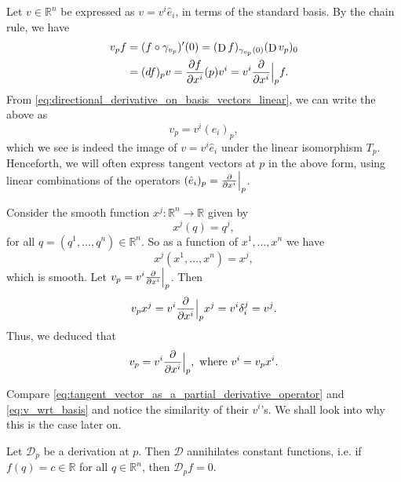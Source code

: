 \documentclass[notoc,notitlepage]{tufte-book}
\DeclareMathOperator{\D}{D}
\begin{document}
Let $v \in \mathbb{R}^n$ be expressed as $v = v^i \hat{e}_i$, in terms of the
standard basis. By the chain rule, we have
\begin{align*}
  v_p f &= (f \circ \gamma_{v_p})'(0) = (\D f)_{\gamma_{v_p}(0)} (\D v_p)_0 \\
    &= (\dif{f})_p v = \frac{\partial f}{\partial x^i}(p) v^i
    = v^i \frac{\partial}{\partial x^i}\at{p}{} f.
\end{align*}
From \cref{eq:directional_derivative_on_basis_vectors_linear}, we can write the
above as
\begin{equation*}
  v_p = v^i (\hat{e}_i)_p,
\end{equation*}
which we see is indeed the image of $v = v^i \hat{e}_i$ under the linear isomorphism
$T_p$.
Henceforth, we will often express tangent vectors at $p$ in the above form, using
linear combinations of the operators $(\hat{e}_i)_p = \frac{\partial}{\partial x^i} \Big|_{p}^{}$.

 Consider the smooth function $x^j : \mathbb{R}^n \to \mathbb{R}$
given by
\begin{equation*}
  x^j(q) = q^j,
\end{equation*}
for all $q = (q^1, \ldots, q^n) \in \mathbb{R}^n$. So as a function of $x^1, \ldots, x^n$ we have
\begin{equation}\label{eq:coefficients_as_smooth_functions}
  x^j(x^1, \ldots, x^n) = x^j,
\end{equation}
which is smooth. Let $v_p = v^i \frac{\partial}{\partial x^i} \Big|_{p}^{}$. Then
\begin{equation*}
  v_p x^j = v^i \frac{\partial}{\partial x^i} \Big|_{p}^{} x^j = v^i \delta_i^j = v^j.
\end{equation*}
Thus, we deduced that
\begin{equation}\label{eq:tangent_vector_as_a_partial_derivative_operator}
  v_p = v^i \frac{\partial}{\partial x^i} \Big|_{p}^{}, \text{ where } v^i = v_p x^i.
\end{equation}

\begin{remark}
  Compare \cref{eq:tangent_vector_as_a_partial_derivative_operator} and
  \cref{eq:v_wrt_basis} and notice the similarity of their $v^i$'s. We shall look into why this
  is the case later on. %
\end{remark}

\begin{lemma}\label{lemma:derivations_annihilates_constant_functions}
  Let $\mathcal{D}_p$ be a derivation at $p$. Then $\mathcal{D}$ annihilates constant functions,
  i.e. if $f(q) = c \in \mathbb{R}$ for all $q \in \mathbb{R}^n$, then $\mathcal{D}_p f = 0$.
\end{lemma}
\end{document}

